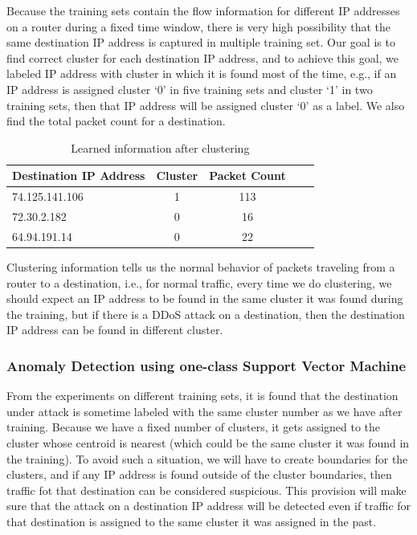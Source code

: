 \documentclass[12pt,oneside,a4paper]{article}
\begin{document}
Because the training sets contain the flow information for different IP addresses on a router during a fixed time window, there is very high possibility that the same destination IP address is captured in multiple training set. Our goal is to find correct cluster for each destination IP address, and to achieve this goal, we labeled IP address with cluster in which it is found most of the time, e.g., if an IP address is assigned cluster `0' in five training sets and cluster `1' in two training sets, then that IP address will be assigned cluster `0' as a label. We also find the total packet count for a destination.

\begin{table}[H]
\centering
  \begin{tabular}{| l | c | c | c | c |}
    \hline
    {Destination IP Address}  &Cluster  &Packet Count \\
    \hline
    74.125.141.106  & 1     & 113  \\ \hline
    72.30.2.182     & 0     & 16   \\ \hline
    64.94.191.14    & 0     & 22   \\ \hline
  \end{tabular}
\caption{Learned information after clustering} \label{table:learned-clustering}
\end{table}

Clustering information tells us the normal behavior of packets traveling from a router to a destination, i.e., for normal traffic, every time we do clustering, we should expect an IP address to be found in the same cluster it was found during the training, but if there is a DDoS attack on a destination, then the destination IP address can be found in different cluster.

\subsubsection{Anomaly Detection using one-class Support Vector Machine} \label{subsec:Anomaly_Detection}

From the experiments on different training sets, it is found that the destination under attack is sometime labeled with the same cluster number as we have after training. Because we have a fixed number of clusters, it gets assigned to the cluster whose centroid is nearest (which could be the same cluster it was found in the training). To avoid such a situation, we will have to create boundaries for the clusters, and if any IP address is found outside of the cluster boundaries, then traffic fot that destination can be considered suspicious. This provision will make sure that the attack on a destination IP address will be detected even if traffic for that destination is assigned to the same cluster it was assigned in the past.
\end{document}
